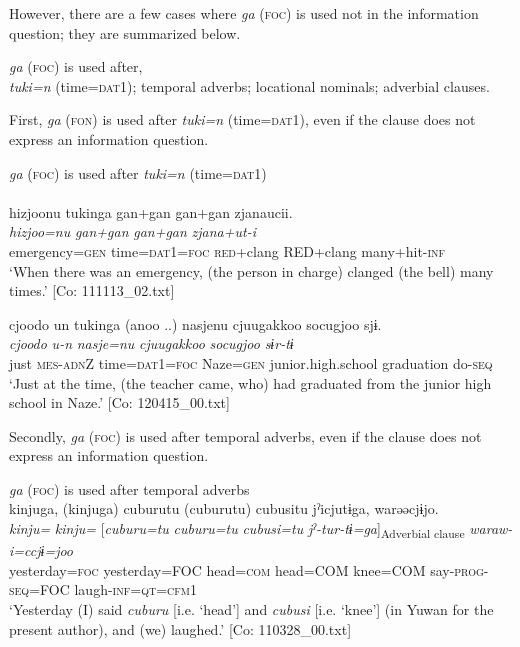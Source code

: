   However, there are a few cases where \textit{ga} (\textsc{foc}) is used not in the information question; they are summarized below.

\ea\label{ex:10.12}\textit{ga} (\textsc{foc}) is used after,\\
  \ea \textit{tuki=n} (time=\textsc{dat}1);
  \ex temporal adverbs;
  \ex locational nominals;
  \ex adverbial clauses.
  \z
\z

First, \textit{ga} (\textsc{fon}) is used after \textit{tuki=n} (time=\textsc{dat}1), even if the clause does not express an information question.

\ea\label{ex:10.13}   \textit{ga} (\textsc{foc}) is used after \textit{tuki=n} (time=\textsc{dat}1)\\
  \ea\relax  [= (4-25 c)]\\
      \glll    {\textbar}hizjoo{\textbar}nu  tukinga  gan+gan  gan+gan                  zjanaucii.\\
      \textit{hizjoo=nu}  \textit{}  \textit{gan+gan}  \textit{gan+gan}        \textit{zjana+ut-i}\\
      emergency=\textsc{gen}  time=\textsc{dat}1=\textsc{foc}  \textsc{red}+clang  RED+clang                                many+hit-\textsc{inf}\\
      \glt       ‘When there was an emergency, (the person in charge) clanged (the bell) many times.’ [Co: 111113\_02.txt]

  \ex  %
      \glll    {\textbar}cjoodo{\textbar}  un  tukinga  (anoo ..)  nasjenu    cjuugakkoo  {\textbar}socugjoo{\textbar}  sjɨ.\\
      \textit{cjoodo}  \textit{u-n}  \textit{}    \textit{nasje=nu}    \textit{cjuugakkoo}  \textit{socugjoo}  \textit{sɨr-tɨ}\\
      just  \textsc{mes}-\textsc{adn}Z  time=\textsc{dat}1=\textsc{foc}    Naze=\textsc{gen}     junior.high.school  graduation  do-\textsc{seq}  \\
      \glt       ‘Just at the time, (the teacher came, who) had graduated from the junior high school in Naze.’ [Co: 120415\_00.txt]
    \z
\z

  Secondly, \textit{ga} (\textsc{foc}) is used after temporal adverbs, even if the clause does not express an information question.

\ea\label{ex:10.14}   \textit{ga} (\textsc{foc}) is used after temporal adverbs\\
  \ea  %
      \glll    kinjuga,  (kinjuga)  cuburutu  (cuburutu)  cubusitu     jˀicjutɨga,  warəəcjɨjo.\\
      \textit{kinju=}  \textit{kinju=}  [\textit{cuburu=tu}  \textit{cuburu=tu}  \textit{cubusi=tu}   \textit{jˀ-tur-tɨ=ga}]\textsubscript{Adverbial clause} \textit{waraw-i=ccjɨ=joo}\\
      yesterday=\textsc{foc}  yesterday=FOC  head=\textsc{com}  head=COM  knee=COM say-\textsc{prog}-\textsc{seq}=FOC  laugh-\textsc{inf}=\textsc{qt}=\textsc{cfm}1\\
      \glt       ‘Yesterday (I) said \textit{cuburu} [i.e. ‘head’] and \textit{cubusi} [i.e. ‘knee’] (in Yuwan for the present author), and (we) laughed.’ [Co: 110328\_00.txt]

